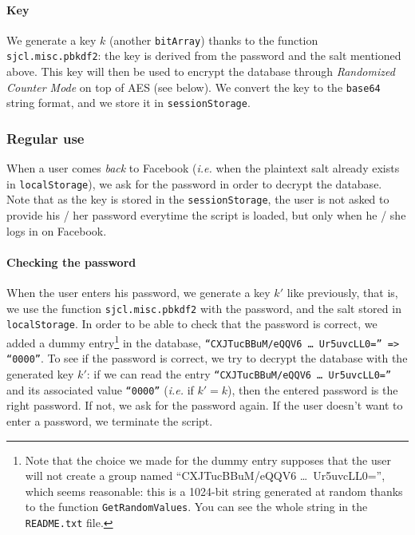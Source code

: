 \documentclass[10pt,twocolumn]{article}
\begin{document}
\paragraph{Key}
We generate a key $k$ (another \texttt{bitArray}) thanks to the function \texttt{sjcl.misc.pbkdf2}: the key is derived from the password and the salt mentioned above. This key will then be used to encrypt the database through \emph{Randomized Counter Mode} on top of AES (see below). We convert the key to the \texttt{base64} string format, and we store it in \texttt{sessionStorage}.


\subsubsection{Regular use}

When a user comes \textit{back} to Facebook (\emph{i.e.} when the plaintext salt already exists in \texttt{localStorage}), we ask for the password in order to decrypt the database. Note that as the key is stored in the \texttt{sessionStorage}, the user is not asked to provide his / her password everytime the script is loaded, but only when he / she logs in on Facebook.

\paragraph{Checking the password}

When the user enters his password, we generate a key $k'$ like previously, that is, we use the function \texttt{sjcl.misc.pbkdf2} with the password, and the salt stored in \texttt{localStorage}. In order to be able to check that the password is correct, we added a dummy entry\footnote{Note that the choice we made for the dummy entry supposes that the user will not create a group named ``CXJTucBBuM/eQQV6 \dots \ Ur5uvcLL0='', which seems reasonable: this is a 1024-bit string generated at random thanks to the function \texttt{GetRandomValues}. You can see the whole string in the \texttt{README.txt} file.} in the database, \texttt{``CXJTucBBuM/eQQV6 \dots \ Ur5uvcLL0='' => ``0000''}. To see if the password is correct, we try to decrypt the database with the generated key $k'$: if we can read the entry \texttt{``CXJTucBBuM/eQQV6 \dots \ Ur5uvcLL0=''} and its associated value \texttt{``0000''} (\emph{i.e.} if $k' = k$), then the entered password is the right password. If not, we ask for the password again. If the user doesn't want to enter a password, we terminate the script.
\end{document}

